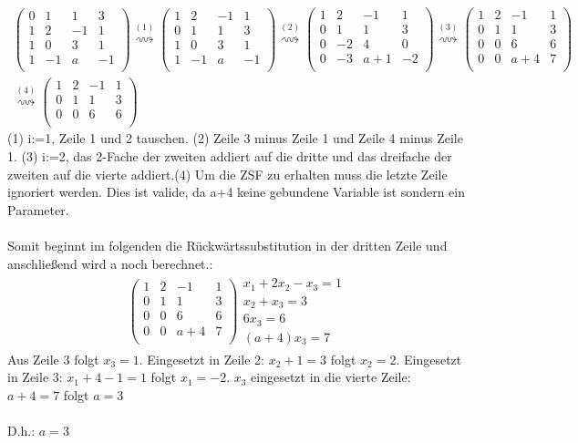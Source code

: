 \documentclass[titlepage]{article}
\begin{document}
	\begin{align*}
		\left(\begin{array}{ccc|c}
			0&1&1&3\\
			1&2&-1&1\\
			1&0&3&1\\
			1&-1&a&-1\\
		\end{array}\right)
		\overset{(1)}{\rightsquigarrow}
		\left(\begin{array}{ccc|c}
			1&2&-1&1\\
			0&1&1&3\\
			1&0&3&1\\
			1&-1&a&-1\\
		\end{array}\right)
		\overset{(2)}{\rightsquigarrow}
		\left(\begin{array}{ccc|c}
			1&2&-1&1\\
			0&1&1&3\\
			0&-2&4&0\\
			0&-3&a+1&-2\\
		\end{array}\right)
		\overset{(3)}{\rightsquigarrow}
		\left(\begin{array}{ccc|c}
			1&2&-1&1\\
			0&1&1&3\\
			0&0&6&6\\
			0&0&a+4&7\\
		\end{array}\right)	
		\\
		\overset{(4)}{\rightsquigarrow}
		\left(\begin{array}{ccc|c}
			1&2&-1&1\\
			0&1&1&3\\
			0&0&6&6\\
		\end{array}\right)
	\end{align*}
	(1) i:=1, Zeile 1 und 2 tauschen. (2) Zeile 3 minus Zeile 1 und Zeile 4 minus Zeile 1. (3) i:=2, das 2-Fache der zweiten addiert auf die dritte und das dreifache der zweiten auf die vierte addiert.(4) Um die ZSF zu erhalten muss die letzte Zeile ignoriert werden. Dies ist valide, da a+4 keine gebundene Variable ist sondern ein Parameter.
	\\\\
	Somit beginnt im folgenden die Rückwärtssubstitution in der dritten Zeile und anschließend wird a noch berechnet.:
	\begin{align*}
		\left(\begin{array}{ccc|c}
		1&2&-1&1\\
		0&1&1&3\\
		0&0&6&6\\
		0&0&a+4&7\\
		\end{array}\right)
		\begin{array}{r}
		x_1+2x_2-x_3=1\\
		x_2+x_3=3\\
		6x_3=6\\
		(a+4)x_3=7
		\end{array}
	\end{align*}
	Aus Zeile 3 folgt $x_3=1$. Eingesetzt in Zeile 2: $x_2+1=3$ folgt $x_2=2$. Eingesetzt in Zeile 3: $x_1+4-1=1$ folgt $x_1=-2$. $x_3$ eingesetzt in die vierte Zeile: $a+4=7$ folgt $a=3$\\\\
	D.h.: \underline{\underline{$a=3$}}
\end{document}

